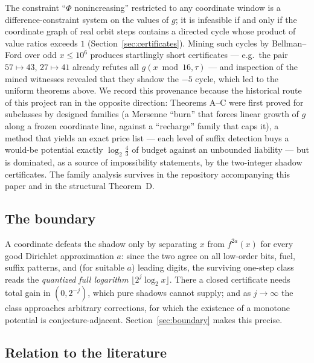 \documentclass[11pt]{article}
\theoremstyle{definition}
\theoremstyle{remark}
\begin{document}
The constraint ``$\Phi$ nonincreasing'' restricted to any coordinate
window is a difference-constraint system on the values of $g$; it is
infeasible if and only if the coordinate graph of real orbit steps
contains a directed cycle whose product of value ratios exceeds $1$
(Section~\ref{sec:certificates}). Mining such cycles by Bellman--Ford
over odd $x\le10^6$ produces startlingly short certificates --- e.g.\
the pair $57\mapsto43$, $27\mapsto41$ already refutes all
$g(x\bmod16,\tau)$ --- and inspection of the mined witnesses revealed
that they shadow the $-5$ cycle, which led to the uniform theorems
above. We record this provenance because the historical route of this
project ran in the opposite direction: Theorems A--C were first proved
for subclasses by designed families (a Mersenne ``burn'' that forces
linear growth of $g$ along a frozen coordinate line, against a
``recharge'' family that caps it), a method that yields an exact price
list --- each level of suffix detection buys a would-be potential
exactly $\log_2\frac43$ of budget against an unbounded liability ---
but is dominated, as a source of impossibility statements, by the
two-integer shadow certificates. The family analysis survives in the
repository accompanying this paper and in the structural
Theorem~D.

\subsection*{The boundary}

A coordinate defeats the shadow only by separating $x$ from
$f^{2a}(x)$ for every good Dirichlet approximation $a$: since the two
agree on all low-order bits, fuel, suffix patterns, and (for suitable
$a$) leading digits, the surviving one-step class reads the
\emph{quantized full logarithm} $\lfloor2^{j}\log_2x\rfloor$. There a
closed certificate needs total gain in $(0,2^{-j})$, which pure shadows
cannot supply; and as $j\to\infty$ the class approaches arbitrary
corrections, for which the existence of a monotone potential is
conjecture-adjacent. Section~\ref{sec:boundary} makes this precise.

\subsection*{Relation to the literature}
\end{document}
